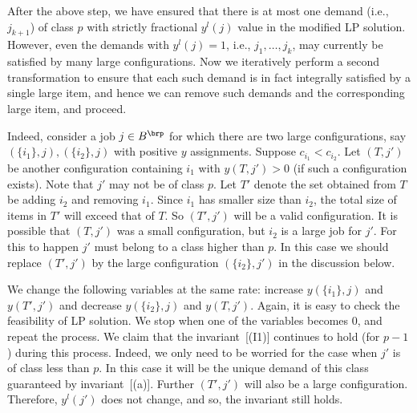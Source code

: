 After the above step, we have ensured that there is at most one demand (i.e., $j_{k+1}$) of class $p$ 
with strictly fractional $y^l(j)$ value in the modified LP solution. However, even the demands with $y^l(j) = 1$, i.e.,  $j_1, \ldots, j_k$,  may currently be satisfied by many large configurations. Now we iteratively perform a second transformation to ensure that each such demand is in fact integrally satisfied by a single large item, and hence we can remove such demands and the corresponding large item, and proceed.

Indeed, consider a  job $j \in B^\brp$ for which there are two large configurations, say $(\{i_1\}, j), (\{i_2\}, j)$ with positive $y$ assignments. Suppose $c_{i_1} < c_{i_2}$. Let $(T,j')$ be another configuration containing $i_1$ with $y(T,j') > 0$ (if such a configuration exists). Note that $j'$ may not be of class $p$. Let $T'$ denote the set obtained from $T$ be adding $i_2$ and removing $i_1$. Since $i_1$ has smaller size than $i_2$, the total size of items in $T'$ will exceed that of $T$. So $(T',j')$ will be a valid configuration. It is possible that $(T,j')$ was a small configuration, but $i_2$ is a large job for $j'$. For this to happen $j'$ must belong to a class higher than $p$. In this case we should replace $(T',j')$ by the large configuration $(\{i_2\},j')$ in the discussion below. %


We change the following variables at the same rate: increase $y(\{i_1\},j)$ and $y(T',j')$ and decrease $y(\{i_2\},j)$ and $y(T,j')$. Again, it is easy to check the feasibility of LP solution. We stop when one of the variables becomes 0, and repeat the process. We claim that the invariant~[(I1)] continues
to hold (for $p-1$) during this process. Indeed, we only need to be worried for the case when $j'$ is of class less than $p$.  In this case it will be the unique demand  of this class guaranteed by invariant~[(a)]. Further $(T',j')$ will also be a large configuration. Therefore, $y^l(j')$ does not change, and so, 
the invariant still holds. 


